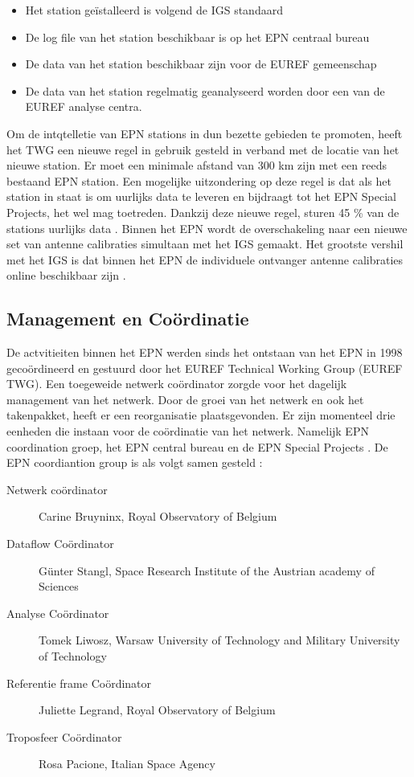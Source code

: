 \begin{itemize}
	\item Het station ge\"istalleerd is volgend de IGS standaard
	\item De log file van het station beschikbaar is op het EPN centraal bureau
	\item De data van het station beschikbaar zijn voor de EUREF gemeenschap
	\item De data van het station regelmatig geanalyseerd worden door een van de EUREF analyse centra. 
\end{itemize} 
Om de intqtelletie van EPN stations in dun bezette gebieden te promoten, heeft het TWG een nieuwe regel in gebruik gesteld in verband met de locatie van het nieuwe station. Er moet een minimale afstand van 300 km zijn met een reeds bestaand EPN station. Een mogelijke uitzondering op deze regel is dat als het station in staat is om uurlijks data te leveren en bijdraagt tot het EPN Special Projects, het wel mag toetreden. Dankzij deze nieuwe regel, sturen 45 \% van de stations uurlijks data \cite{LBibEPN6}. Binnen het EPN wordt de overschakeling naar een nieuwe set van antenne calibraties simultaan met het IGS gemaakt. Het grootste vershil met het IGS is dat binnen het EPN de individuele ontvanger antenne calibraties online beschikbaar zijn \cite{LBibEPN4}.

\subsection{Management en Co\"ordinatie}
De actvitieiten binnen het EPN werden sinds het ontstaan van het EPN in 1998 geco\"ordineerd en gestuurd door het EUREF Technical Working Group (EUREF TWG). Een toegeweide netwerk co\"ordinator zorgde voor het dagelijk management van het netwerk. Door de groei van het netwerk en ook het takenpakket, heeft er een reorganisatie plaatsgevonden. Er zijn momenteel drie eenheden die instaan voor de co\"ordinatie van het netwerk. Namelijk EPN coordination groep, het EPN central bureau en de EPN Special Projects \cite{LBibEPN6}. 
De EPN coordiantion group is als volgt samen gesteld \cite{LBibEPN8}:
\begin{description}
	\item[Netwerk co\"ordinator] Carine Bruyninx, Royal Observatory of Belgium
	\item[Dataflow Co\"ordinator] G\"unter Stangl, Space Research Institute of the Austrian academy of Sciences
	\item[Analyse Co\"ordinator] Tomek Liwosz, Warsaw University of Technology and Military University of Technology
	\item[Referentie frame Co\"ordinator] Juliette Legrand, Royal Observatory of Belgium
	\item[Troposfeer Co\"ordinator] Rosa Pacione, Italian Space Agency
\end{description}

